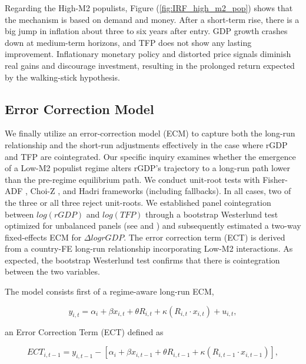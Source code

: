 \documentclass{OUP-EJ}
\begin{document}
Regarding the High-M2 populists, Figure (\ref{fig:IRF_high_m2_pop}) shows that the mechanism is based on demand and money. After a short-term rise, there is a big jump in inflation about three to six years after entry. GDP growth crashes down at medium-term horizons, and TFP does not show any lasting improvement. Inflationary monetary policy and distorted price signals diminish real gains and discourage investment, resulting in the prolonged return expected by the walking-stick hypothesis.

\subsection{Error Correction Model}

We finally utilize an error-correction model (ECM) to capture  both the long-run relationship and the short-run adjustments effectively in the case where rGDP and TFP are cointegrated. Our specific inquiry examines whether the emergence of a Low-M2 populist regime alters rGDP's trajectory to a long-run path lower than the pre-regime equilibrium path. We conduct unit-root tests with Fisher-ADF \cite{MaddalaWu1999}, Choi-Z \cite{Choi2001}, and Hadri \cite{Hadri2000} frameworks (including fallbacks). In all cases, two of the three or all three reject unit-roots.  We established panel cointegration between $log(rGDP)$ and $log(TFP)$ through a bootstrap Westerlund test optimized for unbalanced panels (see \cite{Westerlund2007} and \cite{PersynWesterlund2008}) and subsequently estimated a two-way fixed-effects ECM for $\Delta log rGDP$.  The error correction term (ECT) is derived from a country-FE long-run relationship incorporating Low-M2 interactions. As expected, the bootstrap Westerlund test confirms that there is cointegration between the two variables.

The model consists first of a regime-aware long-run ECM,

\begin{equation}
    y_{i,t}=\alpha_i + \beta x_{i,t} + \theta R_{i,t} + \kappa \left( R_{i,t} \cdot x_{i,t} \right) + u_{i,t},
    \label{eqn:regime-aware_long-run_ECM}
\end{equation}

an Error Correction Term (ECT) defined as

\begin{equation}
    ECT_{i,t-1} = y_{i,t-1} - \left[ \alpha_i + \beta x_{i,t-1} + \theta R_{i,t-1} + \kappa \left( R_{i,t-1} \cdot x_{i,t-1} \right) \right],
    \label{eqn:ECT}
\end{equation}
\end{document}
